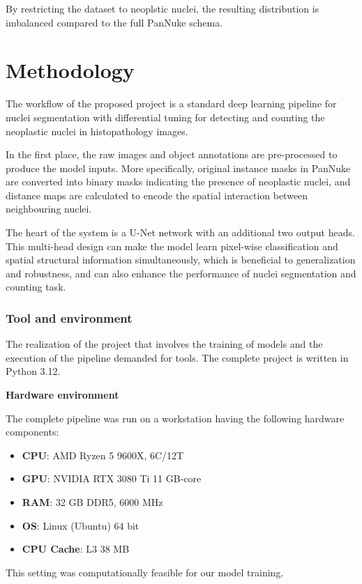\documentclass[target=bach,aauheader=,style=]{thud}
\begin{document}
By restricting the dataset to neoplstic nuclei, the resulting distribution is imbalanced compared to the full PanNuke schema.
\chapter{Methodology}
The workflow of the proposed project is a standard deep learning pipeline for nuclei segmentation with differential tuning for detecting and counting the neoplastic nuclei in histopathology images.

In the first place, the raw images and object annotations are pre-processed to produce the model inputs. More specifically, original instance masks in PanNuke are converted into binary masks indicating the presence of neoplastic nuclei, and distance maps are calculated to encode the spatial interaction between neighbouring nuclei.

The heart of the system is a U-Net \cite{DBLP:journals/corr/RonnebergerFB15} network with an additional two output heads. This multi-head design can make the model learn pixel-wise classification and spatial structural information simultaneously, which is beneficial to generalization and robustness, and can also enhance the performance of nuclei segmentation and counting task.

\subsection{Tool and environment} The realization of the project that involves the training of models and the execution of the pipeline demanded for tools. The complete project is written in Python 3.12. \

\noindent\textbf{Hardware environment}\

\noindent The complete pipeline was run on a workstation having the following hardware components: \begin{itemize} 
    \item \textbf{CPU}: AMD Ryzen 5 9600X, 6C/12T 
    \item \textbf{GPU}: NVIDIA RTX 3080 Ti 11 GB-core
    \item \textbf{RAM}: 32 GB DDR5, 6000 MHz 
    \item \textbf{OS}: Linux (Ubuntu) 64 bit 
    \item \textbf{CPU Cache}: L3 38 MB 
\end{itemize} 
This setting was computationally feasible for our model training.
\end{document}
